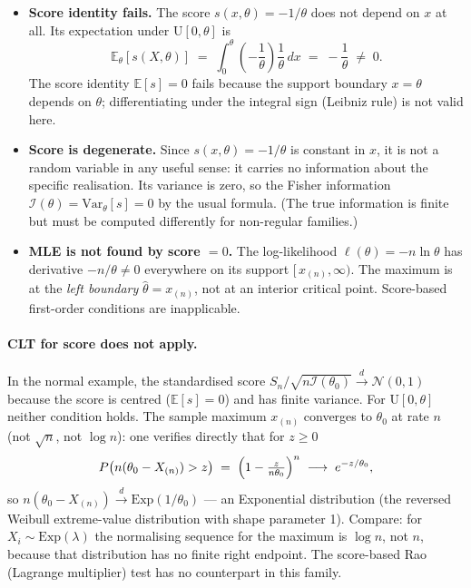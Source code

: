 \documentclass[a4paper,oneside,12pt]{extarticle}
\theoremstyle{plain}
\theoremstyle{definition}
\theoremstyle{remark}
\newcommand*{\E}{\mathbb{E}}
\newcommand*{\Var}{\mathrm{Var}}
\begin{document}
\begin{itemize}
\item \textbf{Score identity fails.}
  The score $s(x,\theta) = -1/\theta$ does not depend on $x$ at all.
  Its expectation under $\mathrm{U}[0,\theta]$ is
  \[
    \E_\theta[s(X,\theta)]
    \;=\; \int_0^\theta \!\!\left(-\frac{1}{\theta}\right)
    \frac{1}{\theta}\,dx
    \;=\; -\frac{1}{\theta} \;\neq\; 0.
  \]
  The score identity $\E[s]=0$ fails because the support boundary
  $x=\theta$ depends on $\theta$; differentiating under the integral
  sign (Leibniz rule) is not valid here.

\item \textbf{Score is degenerate.}
  Since $s(x,\theta)=-1/\theta$ is constant in $x$, it is not a
  random variable in any useful sense: it carries no information
  about the specific realisation.  Its variance is zero, so the
  Fisher information $\mathcal{I}(\theta)=\Var_\theta[s]=0$ by the
  usual formula.  (The true information is finite but must be computed
  differently for non-regular families.)

\item \textbf{MLE is not found by score $= 0$.}
  The log-likelihood $\ell(\theta)=-n\ln\theta$ has derivative
  $-n/\theta\ne 0$ everywhere on its support $[\,x_{(n)},\infty)$.
  The maximum is at the \emph{left boundary} $\hat\theta=x_{(n)}$,
  not at an interior critical point.  Score-based first-order
  conditions are inapplicable.
\end{itemize}

\paragraph{CLT for score does not apply.}
In the normal example, the standardised score
$S_n/\sqrt{n\mathcal{I}(\theta_0)}\xrightarrow{d}\mathcal{N}(0,1)$
because the score is centred ($\E[s]=0$) and has finite variance.
For $\mathrm{U}[0,\theta]$ neither condition holds.  The sample
maximum $x_{(n)}$ converges to $\theta_0$ at rate $n$ (not $\sqrt{n}$,
not $\log n$): one verifies directly that for $z\ge 0$
\[
  P\bigl(n(\theta_0 - X_{(n)}) > z\bigr)
  \;=\; \Bigl(1 - \tfrac{z}{n\theta_0}\Bigr)^n
  \;\longrightarrow\; e^{-z/\theta_0},
\]
so $n(\theta_0 - X_{(n)})\xrightarrow{d}\mathrm{Exp}(1/\theta_0)$ ---
an Exponential distribution (the reversed Weibull extreme-value
distribution with shape parameter 1).  Compare: for
$X_i\sim\mathrm{Exp}(\lambda)$ the normalising sequence for the
maximum is $\log n$, not $n$, because that distribution has no
finite right endpoint.  The score-based Rao (Lagrange multiplier)
test has no counterpart in this family.
\end{document}
